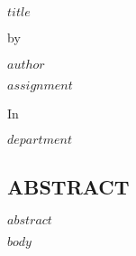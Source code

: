 \documentclass[12pt]{article}
\begin{document}
\pagestyle{beginning}
\renewcommand{\bfseries}{\relax}
\begin{center}
$title$

\vspace{36pt}

by

\vspace{12pt}

$author$

\vspace{36pt}

$assignment$

\vspace{36pt}

In

\vspace{12pt}

$department$

\pagebreak


\end{center}


\begin{flushleft}
	
\hypertarget{ABSTRACT}{%
\section*{ABSTRACT}\label{ABSTRACT}}

$abstract$

\pagebreak

\tableofcontents

\pagebreak

\pagestyle{body}



$body$

\end{flushleft}
\end{document}
